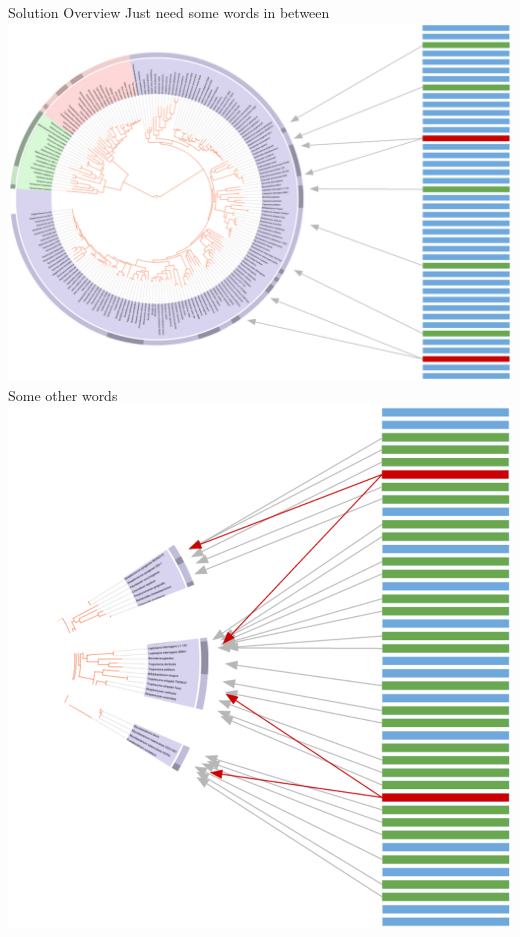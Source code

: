 \documentclass[final,t]{beamer}
\begin{document}
\begin{frame}{}
\begin{columns}[t]
\begin{column}{.3\linewidth}
        \begin{block}{Solution Overview}
            Just need some words in between \\
            \includegraphics[width=1\linewidth]{assets/Whole} \\
            Some other words \\
            \includegraphics[width=0.679\linewidth, right]{assets/Subset}
        \end{block}


    \end{column}



\end{columns}
\end{frame}
\end{document}

